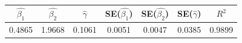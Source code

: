 \begin{tabular}{ccccccc}
\toprule
$\hat{\beta_1}$ & $\hat{\beta_2}$ & $\hat{\gamma}$ & SE($\hat{\beta_1}$) & SE($\hat{\beta_2}$) & SE($\hat{\gamma}$) & $R^2$ \\
\midrule
0.4865 & 1.9668 & 0.1061 & 0.0051 & 0.0047 & 0.0385 & 0.9899 \\
\bottomrule
\end{tabular}